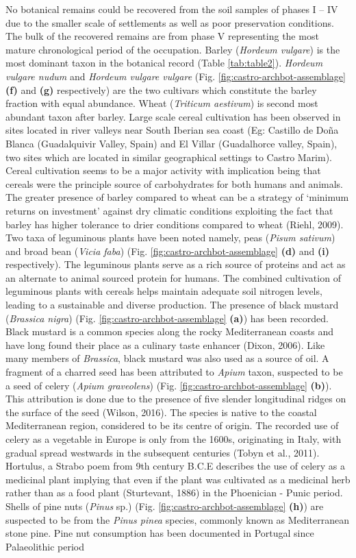 \documentclass[5p]{elsarticle} %
\begin{document}
No botanical remains could be recovered from the soil samples of phases I -- IV due to the smaller scale of settlements as well as poor preservation conditions. The bulk of the recovered remains are from phase V representing the most mature chronological period of the occupation. Barley (\emph{Hordeum vulgare}) is the most dominant taxon in the botanical record (Table \ref{tab:table2}). \emph{Hordeum vulgare nudum} and \emph{Hordeum vulgare vulgare} (Fig. \ref{fig:castro-archbot-assemblage} \textbf{(f)} and \textbf{(g)} respectively) are the two cultivars which constitute the barley fraction with equal abundance. Wheat (\emph{Triticum aestivum}) is second most abundant taxon after barley. Large scale cereal cultivation has been observed in sites located in river valleys near South Iberian sea coast (Eg: Castillo de Doña Blanca (Guadalquivir Valley, Spain) and El Villar (Guadalhorce valley, Spain), two sites which are located in similar geographical settings to Castro Marim). Cereal cultivation seems to be a major activity with implication being that cereals were the principle source of carbohydrates for both humans and animals. The greater presence of barley compared to wheat can be a strategy of `minimum returns on investment' against dry climatic conditions exploiting the fact that barley has higher tolerance to drier conditions compared to wheat (Riehl, 2009). Two taxa of leguminous plants have been noted namely, peas (\emph{Pisum sativum}) and broad bean (\emph{Vicia faba}) (Fig. \ref{fig:castro-archbot-assemblage} \textbf{(d)} and \textbf{(i)} respectively). The leguminous plants serve as a rich source of proteins and act as an alternate to animal sourced protein for humans. The combined cultivation of leguminous plants with cereals helps maintain adequate soil nitrogen levels, leading to a sustainable and diverse production. The presence of black mustard (\emph{Brassica nigra}) (Fig. \ref{fig:castro-archbot-assemblage} \textbf{(a)}) has been recorded. Black mustard is a common species along the rocky Mediterranean coasts and have long found their place as a culinary taste enhancer (Dixon, 2006). Like many members of \emph{Brassica}, black mustard was also used as a source of oil. A fragment of a charred seed has been attributed to \emph{Apium} taxon, suspected to be a seed of celery (\emph{Apium graveolens}) (Fig. \ref{fig:castro-archbot-assemblage} \textbf{(b)}). This attribution is done due to the presence of five slender longitudinal ridges on the surface of the seed (Wilson, 2016). The species is native to the coastal Mediterranean region, considered to be its centre of origin. The recorded use of celery as a vegetable in Europe is only from the 1600s, originating in Italy, with gradual spread westwards in the subsequent centuries (Tobyn et al., 2011). Hortulus, a Strabo poem from 9th century B.C.E describes the use of celery as a medicinal plant implying that even if the plant was cultivated as a medicinal herb rather than as a food plant (Sturtevant, 1886) in the Phoenician - Punic period. Shells of pine nuts (\emph{Pinus} sp.) (Fig. \ref{fig:castro-archbot-assemblage} \textbf{(h)}) are suspected to be from the \emph{Pinus pinea} species, commonly known as Mediterranean stone pine. Pine nut consumption has been documented in Portugal since Palaeolithic period 
\end{document}
